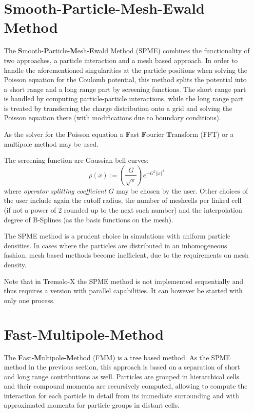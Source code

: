 \section{Smooth-Particle-Mesh-Ewald Method}
The \textbf{S}mooth-\textbf{P}article-\textbf{M}esh-\textbf{E}wald Method (SPME) combines the functionality of two approaches, a particle interaction and a mesh based approach. 
In order to handle the aforementioned singularities at the particle positions when solving the Poisson equation for the Coulomb potential, this method splits the potential
into a short range and a long range part by screening functions. The short range part is handled by computing particle-particle interactions, 
while the long range part is treated by transferring the charge distribution onto a grid and solving the Poisson equation there (with modifications due to boundary conditions).

As the solver for the Poisson equation a \textbf{F}ast \textbf{F}ourier \textbf{T}ransform (FFT) or a multipole method may be used.

The screening function are Gaussian bell curves:
\begin{equation*}
\rho(x) := \left(\frac{G}{\sqrt\pi} \right) e^{-G^2 \left\Vert x\right\Vert^2 }
\end{equation*}
where \emph{operator splitting coefficient} $G$ may be chosen by the user. Other choices of the user include again the cutoff radius, the number of meshcells per linked cell (if not a power of 2 rounded up to the next such number) and the interpolation degree of B-Splines (as the basis functions on the mesh).

The SPME method is a prudent choice in simulations with uniform particle densities. In cases where the particles are distributed in an inhomogeneous fashion, mesh based methods become inefficient, due to the requirements on mesh density.

Note that in Tremolo-X the SPME method is not implemented sequentially and thus requires a version with parallel capabilities. It can however be started with only one process.

\section{Fast-Multipole-Method}
The \textbf{F}ast-\textbf{M}ultipole-\textbf{M}ethod (FMM) is a tree based method. As the SPME method in the previous section, this approach is based on a separation of short and long range contributions as well. Particles are grouped in hierarchical cells and their compound momenta are recursively computed, allowing to compute the interaction for each particle in detail
from its immediate surrounding and with approximated momenta for particle groups in distant cells.

